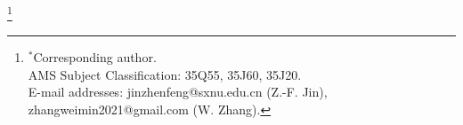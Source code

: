 \documentclass[10pt]{article}
\numberwithin{equation}{section}
\renewcommand\theequation{\thesection.\arabic{equation}}
\numberwithin{equation}{section}
\begin{document}
\begin{center}
\renewcommand{\theequation}{\arabic{section}.\arabic{equation}}
\footnote[0]{\hspace*{-7.4mm}
$^*$Corresponding author.\\
AMS Subject Classification: 35Q55, 35J60, 35J20.\\
{E-mail addresses: jinzhenfeng@sxnu.edu.cn (Z.-F. Jin), zhangweimin2021@gmail.com (W. Zhang).}}
\end{center}
\end{document}
